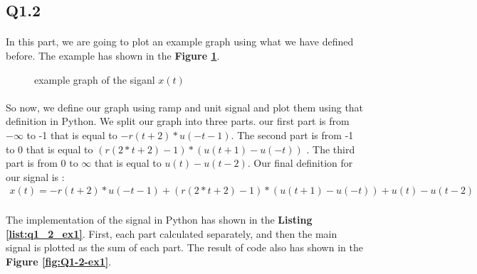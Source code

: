 \subsection{Q1.2}

\paragraph{}In this part, we are going to plot an example 
graph using what we have defined before. The example has 
shown in the \textbf{Figure \ref{fig:ex1}}.

\begin{figure}[H]
 \centering
{}
\caption{example graph of the siganl $x(t)$}
  \label{fig:ex1}
\end{figure}

\paragraph{}So now, we define our graph using ramp and unit 
signal and plot them using that definition in Python. We 
split our graph into three parts. our first part is from 
$-\infty$ to -1 that is equal to $-r(t+2) * u(-t-1)$. The 
second part is from -1 to 0 that is equal to $(r(2*t+2)-1) *(u(t+1)-u(-t))$
. The third part is from 0 to $\infty$ that is equal to 
$u(t) -u(t-2)$. Our final definition for our signal is :
\begin{align}
  x(t) = -r(t+2) * u(-t-1) + (r(2*t+2)-1) *(u(t+1)-u(-t)) + u(t) -u(t-2)
 \end{align}
 \paragraph{}The implementation of the signal in Python
  has shown in the \textbf{Listing \ref{list:q1_2_ex1}}. First, each 
  part calculated separately, and then the main signal 
  is plotted as the sum of each part. The result of code 
  also has shown in the \textbf{Figure \ref{fig:Q1-2-ex1}}.



